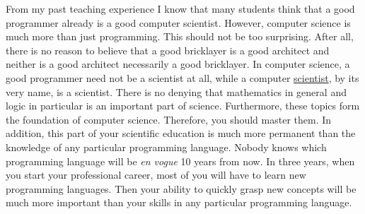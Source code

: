 From my past teaching experience I know that many students think that a good programmer already is a
good computer scientist.  However, computer science is much more than just programming.
This should not be too surprising.  After all, there is no reason to believe that a good bricklayer is a good
architect and neither is a good architect necessarily a good bricklayer.
In computer science, a good programmer need not be a scientist at all, while a
{\color{blue}computer \underline{scientist}}, by its very name, is a {\color{blue}scientist}.  
There is no denying that {\color{blue}mathematics} in general and 
{\color{blue}logic} in particular is an important part of science.  Furthermore, these topics form the
foundation of computer science.  Therefore, you should master them.  In addition, this
part of your scientific education is much more permanent than the knowledge of any particular programming
language.  Nobody knows which programming language will be \emph{en vogue} 10 years from now.  In three 
years, when you start your professional career, most of you will have to learn new
programming languages.   Then your ability to quickly grasp new concepts will be much more important than your
skills in any particular programming language. 

